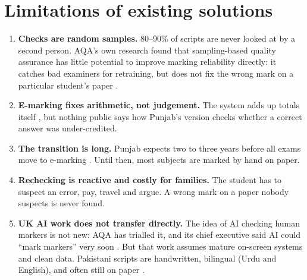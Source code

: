 \section{Limitations of existing solutions}
\begin{enumerate}
  \item \textbf{Checks are random samples.} 80--90\% of scripts are never looked at by a second person. AQA's own research
        found that sampling-based quality assurance has little potential to improve marking reliability directly: it
        catches bad examiners for retraining, but does not fix the wrong mark on a particular student's paper
        \citep{pinotdemoira}.
  \item \textbf{E-marking fixes arithmetic, not judgement.} The system adds up totals itself \citep{ofqual2018}, but nothing
        public says how Punjab's version checks whether a correct answer was under-credited.
  \item \textbf{The transition is long.} Punjab expects two to three years before all exams move to e-marking
        \citep{pakobserver2026}. Until then, most subjects are marked by hand on paper.
  \item \textbf{Rechecking is reactive and costly for families.} The student has to suspect an error, pay, travel and argue.
        A wrong mark on a paper nobody suspects is never found.
  \item \textbf{UK AI work does not transfer directly.} The idea of AI checking human markers is not new: AQA has trialled
        it, and its chief executive said AI could ``mark markers'' very soon \citep{tes2024aqa,schoolsweek2026}. But that
        work assumes mature on-screen systems and clean data. Pakistani scripts are handwritten, bilingual (Urdu and
        English), and often still on paper .
\end{enumerate}

